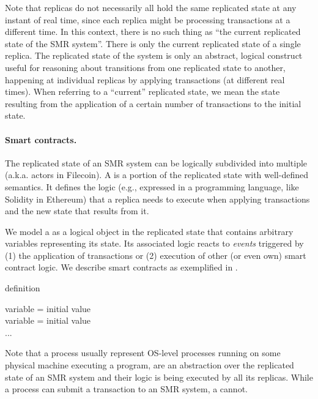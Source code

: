 Note that replicas do not necessarily all hold the same replicated state at any instant of real time,
since each replica might be processing transactions at a different time.
In this context, there is no such thing as “the current replicated state of the SMR system”.
There is only the current replicated state of a single replica.
The replicated state of the system is only an abstract, logical construct
useful for reasoning about transitions from one replicated state to another,
happening at individual replicas by applying transactions (at different real times).
When referring to a “current” replicated state, we mean the state resulting from the application of a certain number of transactions to the initial state.

\paragraph{Smart contracts.}
The replicated state of an SMR system can be logically subdivided into multiple \emph{\dapps} (a.k.a. actors in Filecoin).
A \dapp is a portion of the replicated state with well-defined semantics.
It defines the logic (e.g., expressed in a programming language, like Solidity in Ethereum)
that a replica needs to execute when applying transactions and the new state that results from it.

We model a \dapp as a logical object in the replicated state that contains arbitrary variables representing its state.
Its associated logic reacts to \emph{events} triggered by (1) the application of transactions or (2) execution of other (or even own) smart contract logic. We describe smart contracts as exemplified in .

\begin{algorithm}[H]
\footnotesize
\caption{\dapp definition}\label{alg:dapp-definition}
  \DontPrintSemicolon
  variable = initial value\\
  variable = initial value\\
  ...\\
\end{algorithm}
Note that a process usually represent OS-level processes running on some physical machine executing a program,
\dapps are an abstraction over the replicated state of an SMR system and their logic is being executed by all its replicas.
While a process can submit a transaction to an SMR system, a \dapp cannot.


